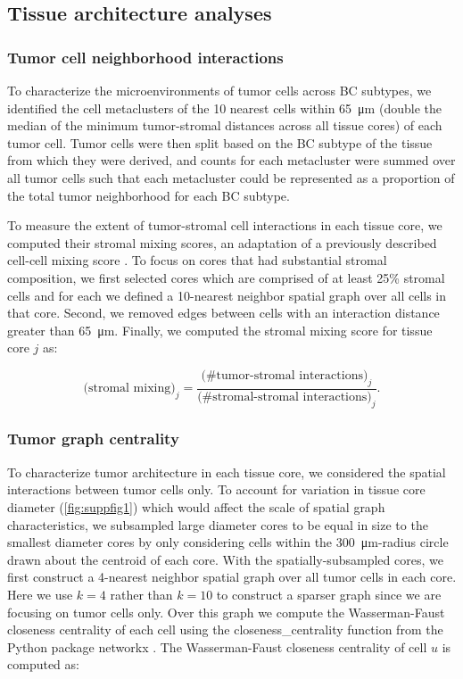 \documentclass[preprint,review,3p,12pt]{elsarticle}
\begin{document}
\subsection{Tissue architecture analyses}
\subsubsection{Tumor cell neighborhood interactions}
To characterize the microenvironments of tumor cells across BC subtypes, we identified the cell metaclusters of the 10 nearest cells within \SI{65}{\micro\meter} (double the median of the minimum tumor-stromal distances across all tissue cores) of each tumor cell. Tumor cells were then split based on the BC subtype of the tissue from which they were derived, and counts for each metacluster were summed over all tumor cells such that each metacluster could be represented as a proportion of the total tumor neighborhood for each BC subtype. 

To measure the extent of tumor-stromal cell interactions in each tissue core, we computed their stromal mixing scores, an adaptation of a previously described cell-cell mixing score \cite{keren2018}. To focus on cores that had substantial stromal composition, we first selected cores which are comprised of at least 25\% stromal cells and for each we defined a 10-nearest neighbor spatial graph over all cells in that core. Second, we removed edges between cells with an interaction distance greater than \SI{65}{\micro\meter}. Finally, we computed the stromal mixing score for tissue core $j$ as:

\begin{equation}
\label{eq:sm}
\text{(stromal mixing)}_{j} = \frac{\text{(\# tumor-stromal interactions)}_{j}}{\text{(\# stromal-stromal interactions)}_{j}}.
\end{equation}

\subsubsection{Tumor graph centrality}
To characterize tumor architecture in each tissue core, we considered the spatial interactions between tumor cells only. To account for variation in tissue core diameter (\autoref{fig:suppfig1}) which would affect the scale of spatial graph characteristics, we subsampled large diameter cores to be equal in size to the smallest diameter cores by only considering cells within the \SI{300}{\micro\meter}-radius circle drawn about the centroid of each core. With the spatially-subsampled cores, we first construct a 4-nearest neighbor spatial graph over all tumor cells in each core. Here we use $k=4$ rather than $k=10$ to construct a sparser graph since we are focusing on tumor cells only. Over this graph we compute the Wasserman-Faust closeness centrality of each cell using the closeness\_centrality function from the Python package networkx \cite{networkx2008}. The Wasserman-Faust closeness centrality of cell $u$ is computed as:
\end{document}
